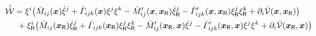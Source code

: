 \begin{align}
 \totalEnergyCd &= \sysVelCoeff{\LidxI} \big( \sysInertiaMatCoeffC{\LidxI\LidxII}(\sysCoord) \sysVelCoeffd{\LidxII}
 + \ConnCoeffLC{\LidxI}{\LidxII}{\LidxIII}(\sysCoord) \sysVelCoeff{\LidxII} \sysVelCoeff{\LidxIII}
 - \sysInertiaMatCoeffC{\LidxI\LidxII}'(\sysCoord, \sysCoordR) \sysVelCoeffRd{\LidxII}
 - \ConnCoeffLC{\LidxI}{\LidxII}{\LidxIII}'(\sysCoord, \sysCoordR) \sysVelCoeffR{\LidxII} \sysVelCoeffR{\LidxIII}
 + \dirDiff{\LidxI} \potentialEnergyC(\sysCoord, \sysCoordR) \big)
\nonumber\\
 & \
 + \sysVelCoeffR{\LidxI} \big( \sysInertiaMatCoeffC{\LidxI\LidxII}(\sysCoordR) \sysVelCoeffRd{\LidxII}
 + \ConnCoeffLC{\LidxI}{\LidxII}{\LidxIII}(\sysCoordR) \sysVelCoeffR{\LidxII} \sysVelCoeffR{\LidxIII}
 - \sysInertiaMatCoeffC{\LidxI\LidxII}'(\sysCoordR, \sysCoord) \sysVelCoeffd{\LidxII}
 - \ConnCoeffLC{\LidxI}{\LidxII}{\LidxIII}'(\sysCoordR, \sysCoord) \sysVelCoeff{\LidxII} \sysVelCoeff{\LidxIII}
 + \dirDiff{\LidxI} \potentialEnergyC(\sysCoordR, \sysCoord) \big)
\nonumber\\[1ex]

\end{align}
